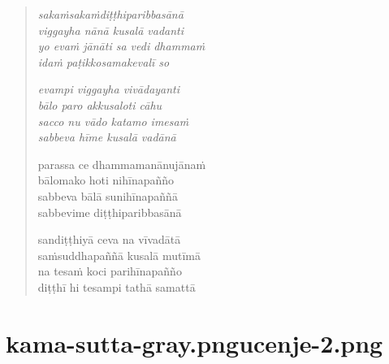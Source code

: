 

\cleartoverso

\vspace*{30mm}

\begin{verse}

\emph{sakaṁsakaṁdiṭṭhiparibbasānā\\
viggayha nānā kusalā vadanti}\\
\emph{yo evaṁ jānāti sa vedi dhammaṁ\\
idaṁ paṭikkosamakevalī so}

\emph{evampi viggayha vivādayanti\\
bālo paro akkusaloti cāhu}\\
\emph{sacco nu vādo katamo imesaṁ\\
sabbeva hīme kusalā vadānā}

parassa ce dhammamanānujānaṁ\\
bālomako hoti nihīnapañño\\
sabbeva bālā sunihīnapaññā\\
sabbevime diṭṭhiparibbasānā

sandiṭṭhiyā ceva na vīvadātā\\
saṁsuddhapaññā kusalā mutīmā\\
na tesaṁ koci parihīnapañño\\
diṭṭhī hi tesampi tathā samattā

\end{verse}


\chapter[Cūḷabyūha Sutta]{{kama-sutta-gray.png}{ucenje-2.png}}


